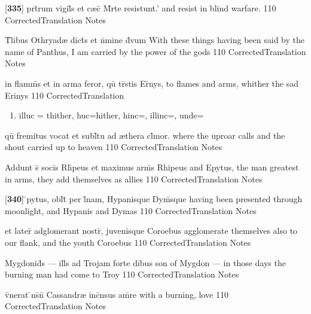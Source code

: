 \latline
  {[\textbf{335}] prt\={}rum vigil\={}s et c{\ae}c\={} M\={}rte resistunt.'}
  { and resist in blind warfare. }
  {110}
  { CorrectedTranslation }
  { Notes }


\latline
  {T\={}libus Othryad{\ae} dict\={\macron {\i}}s et n\={}mine d\={\macron {\i}}vum}
  { With these things having been said by the name of Panthus, I am carried by the power of the gods }
  {110}
  { CorrectedTranslation }
  { Notes }


\latline
  {in flamm\={}s et in arma feror, qu\={} tr\={\macron {\i}}stis Er\={\macron {\i}}nys,}
  { to flames and arms, whither the sad Erinys }
  {110}
  { CorrectedTranslation }
  { \begin{enumerate}
  	\item illuc = thither, huc=hither, hinc=, illinc=, unde=
  \end{enumerate} }


\latline
  {qu\={} fremitus vocat et subl\={}tu ad {\ae}thera cl\={}mor.}
  { where the uproar calls and the shout carried up to heaven }
  {110}
  { CorrectedTranslation }
  { Notes }


\latline
  {Addunt s\={} soci\={}s Rh\={\macron {\i}}peus et maximus arm\={\macron {\i}}s}
  { Rhipeus and Epytus, the man greatest in arms, they add themselves as allies }
  {110}
  { CorrectedTranslation }
  { Notes }


\latline
  {[\textbf{340}] \={}pytus, obl\={}t\={\macron {\i}} per l\={}nam, Hypanisque Dym\={}sque}
  { having been presented through moonlight, and Hypanis and Dymas  }
  {110}
  { CorrectedTranslation }
  { Notes }

\latline
  {et later\={\macron {\i}} adglomerant nostr\={}, juvenisque Coroebus}
  { agglomerate themselves also to our flank, and the youth Coroebus }
  {110}
  { CorrectedTranslation }
  { Notes }


\latline
  {Mygdonid\={}s --- ill\={\macron {\i}}s ad Trojam forte di\={}bus}
  { son of Mygdon --- in those days the burning man had come to Troy }
  {110}
  { CorrectedTranslation }
  { Notes }


\latline
  {v\={}nerat \={\macron {\i}}ns\={}n\={} Cassandr{\ae} inc\={}nsus am\={}re}
  { with a burning, love }
  {110}
  { CorrectedTranslation }
  { Notes }


